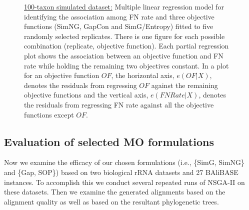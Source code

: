 \begin{figure}[!htbp]
\begin{adjustwidth}{-1cm}{-1cm}
\begin{tabular}{l||C{0.24\textwidth}|C{0.24\textwidth}|C{0.24\textwidth}|C{0.24\textwidth} }
			 & 
			 & 
			\\\hline
		\end{tabular}	
		\caption[Multiple linear regression model with our prorposed objective functions for 100-taxon simulated dataset]{\underline{100-taxon simulated dataset:} Multiple linear regression model for identifying the association among FN rate and three objective functions (SimNG, GapCon and SimG/Entropy) fitted to five randomly selected replicates. There is one figure for each possible combination (replicate, objective function). Each partial regression plot shows the association between an objective function and FN rate while holding the remaining two objectives constant.  In a plot for an objective function $ OF $, the horizontal axis, $e(OF|X)$, denotes the residuals from regressing $OF$ against the remaining objective functions and the vertical axis, $e(FNRate|X)$, denotes the residuals from regressing FN rate against all the objective functions except $ OF $.}
		\label{fig:new_mul_lin_reg}
	\end{adjustwidth}
\end{figure}

\subsection{Evaluation of selected MO formulations}\label{sec:eval_formulation}Now we examine the efficacy of our chosen formulations (i.e., \{SimG, SimNG\} and \{Gap, SOP\}) based on two biological rRNA datasets and 27 BAliBASE instances. To accomplish this we conduct several repeated runs of NSGA-II on these datasets. Then we examine the generated alignments based on the alignment quality as well as based on the resultant phylogenetic trees.

